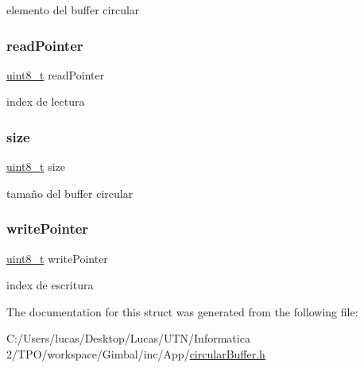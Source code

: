 elemento del buffer circular \mbox{\label{struct_circular_buffer_a20080c7fe1d1a703c43a00b6cd132171}} 
\subsubsection{\texorpdfstring{readPointer}{readPointer}}
{\footnotesize\ttfamily \mbox{\hyperlink{_regs___l_p_c176x_8h_aba7bc1797add20fe3efdf37ced1182c5}{uint8\+\_\+t}} read\+Pointer}

index de lectura \mbox{\label{struct_circular_buffer_ae5dc6ffcd9b7605c7787791e40cc6bb0}} 
\subsubsection{\texorpdfstring{size}{size}}
{\footnotesize\ttfamily \mbox{\hyperlink{_regs___l_p_c176x_8h_aba7bc1797add20fe3efdf37ced1182c5}{uint8\+\_\+t}} size}

tamaño del buffer circular \mbox{\label{struct_circular_buffer_a6d15a4d8d6155ad6e4ad9f790b9dc73f}} 
\subsubsection{\texorpdfstring{writePointer}{writePointer}}
{\footnotesize\ttfamily \mbox{\hyperlink{_regs___l_p_c176x_8h_aba7bc1797add20fe3efdf37ced1182c5}{uint8\+\_\+t}} write\+Pointer}

index de escritura 

The documentation for this struct was generated from the following file\+:\begin{DoxyCompactItemize}
\item 
C\+:/\+Users/lucas/\+Desktop/\+Lucas/\+U\+T\+N/\+Informatica 2/\+T\+P\+O/workspace/\+Gimbal/inc/\+App/\mbox{\hyperlink{circular_buffer_8h}{circular\+Buffer.\+h}}\end{DoxyCompactItemize}
